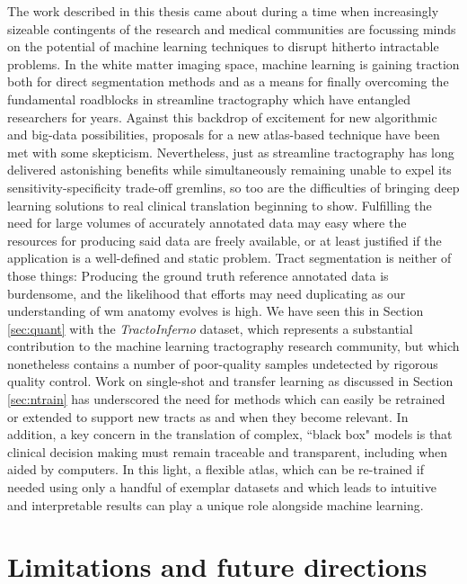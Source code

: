 The work described in this thesis came about during a time when increasingly sizeable contingents of the research and medical communities are focussing minds on the potential of machine learning techniques to disrupt hitherto intractable problems.
In the white matter imaging space, machine learning is gaining traction both for direct segmentation methods and as a means for finally overcoming the fundamental roadblocks in streamline tractography which have entangled researchers for years.
Against this backdrop of excitement for new algorithmic and big-data possibilities, proposals for a new atlas-based technique have been met with some skepticism.
Nevertheless, just as streamline tractography has long delivered astonishing benefits while simultaneously remaining unable to expel its sensitivity-specificity trade-off gremlins, so too are the difficulties of bringing deep learning solutions to real clinical translation beginning to show.
Fulfilling the need for large volumes of accurately annotated data may easy where the resources for producing said data are freely available, or at least justified if the application is a well-defined and static problem.
Tract segmentation is neither of those things:
Producing the ground truth reference annotated data is burdensome, and the likelihood that efforts may need duplicating as our understanding of \gls{wm} anatomy evolves is high.
We have seen this in Section \ref{sec:quant} with the \textit{TractoInferno} dataset, which represents a substantial contribution to the machine learning tractography research community, but which nonetheless contains a number of poor-quality samples undetected by rigorous quality control.
Work on single-shot and transfer learning as discussed in Section \ref{sec:ntrain} has underscored the need for methods which can easily be retrained or extended to support new tracts as and when they become relevant.
In addition, a key concern in the translation of complex, ``black box" models is that clinical decision making must remain traceable and transparent, including when aided by computers.
In this light, a flexible atlas, which can be re-trained if needed using only a handful of exemplar datasets and which leads to intuitive and interpretable results can play a unique role alongside machine learning.

\section{Limitations and future directions}\label{sec:future}


